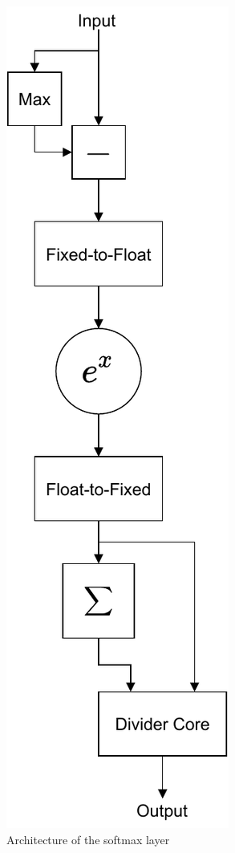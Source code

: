 \begin{figure}
	\centering 
	\includegraphics[height=\textheight]{figures/softmax}
	\caption{Architecture of the softmax layer}\label{softmax-arch}
\end{figure}


